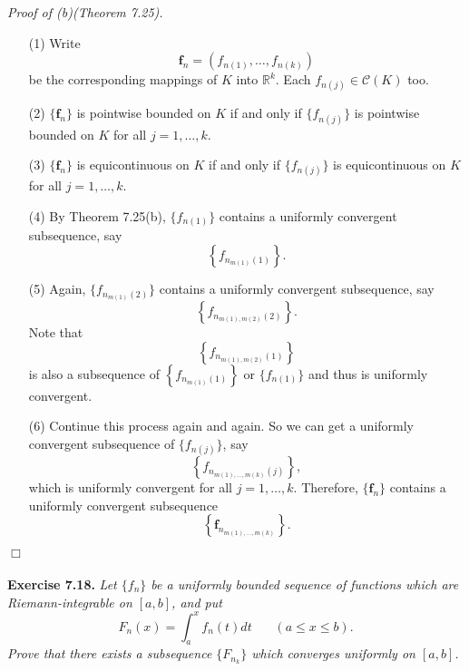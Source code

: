 \documentclass{article}
\begin{document}
\emph{Proof of (b)(Theorem 7.25).}
\begin{enumerate}
\item[(1)]
  Write
  \[
    \mathbf{f}_n = \left(f_{n(1)}, \ldots, f_{n(k)}\right)
  \]
  be the corresponding mappings of $K$ into $\mathbb{R}^k$.
  Each $f_{n(j)} \in \mathscr{C}(K)$ too.

\item[(2)]
  $\{\mathbf{f}_n\}$ is pointwise bounded on $K$
  if and only if
  $\{ f_{n(j)} \}$ is pointwise bounded on $K$ for all $j=1,\ldots,k$.

\item[(3)]
  $\{\mathbf{f}_n\}$ is equicontinuous on $K$
  if and only if
  $\{ f_{n(j)} \}$ is equicontinuous on $K$ for all $j=1,\ldots,k$.

\item[(4)]
  By Theorem 7.25(b),
  $\{ f_{n(1)} \}$ contains a uniformly convergent subsequence,
  say
  \[
    \left\{ f_{n_{m(1)}(1)} \right\}.
  \]

\item[(5)]
  Again,
  $\{ f_{n_{m(1)}(2)} \}$ contains a uniformly convergent subsequence,
  say
  \[
    \left\{ f_{n_{m(1),m(2)}(2)} \right\}.
  \]
  Note that
  \[
    \left\{ f_{n_{m(1),m(2)}(1)} \right\}
  \]
  is also a subsequence of $\left\{ f_{n_{m(1)}(1)} \right\}$ or $\{f_{n(1)}\}$
  and thus is uniformly convergent.

\item[(6)]
  Continue this process again and again.
  So we can get a uniformly convergent subsequence of $\{ f_{n(j)} \}$,
  say
  \[
    \left\{ f_{n_{m(1),\ldots,m(k)}(j)} \right\},
  \]
  which is uniformly convergent for all $j=1,\ldots,k$.
  Therefore,
  $\{\mathbf{f}_n\}$ contains a uniformly convergent subsequence
  \[
    \left\{ \mathbf{f}_{n_{m(1),\ldots,m(k)}} \right\}.
  \]
  \end{enumerate}
$\Box$ \\\\






\textbf{Exercise 7.18.}
\emph{Let $\{f_n\}$ be a uniformly bounded sequence of functions which are
Riemann-integrable on $[a,b]$, and put
\[
  F_n(x) = \int_{a}^{x} f_n(t)dt
  \:\:\:\:\:\:\:\:
  (a \leq x \leq b).
\]
Prove that there exists a subsequence $\{F_{n_k}\}$ which
converges uniformly on $[a,b]$.} \\
\end{document}
